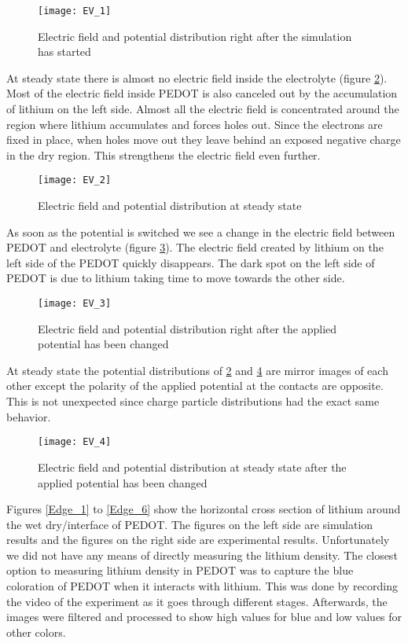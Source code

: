 \begin{figure}[!htp]
\centering
\texttt{[image: EV\_1]}
\caption{Electric field and potential distribution right after the simulation has started} 
\label{EV_1}
\end{figure}

At steady state there is almost no electric field inside the electrolyte (figure \ref{EV_2}). Most of the electric field inside PEDOT is also canceled out by the accumulation of lithium on the left side. Almost all the electric field is concentrated around the region where lithium accumulates and forces holes out. Since the electrons are fixed in place, when holes move out they leave behind an exposed negative charge in the dry region. This strengthens the electric field even further.

\begin{figure}[!htp]
\centering
\texttt{[image: EV\_2]}
\caption{Electric field and potential distribution at steady state} 
\label{EV_2}
\end{figure}

As soon as the potential is switched we see a change in the electric field between PEDOT and electrolyte (figure \ref{EV_3}). The electric field created by lithium on the left side of the PEDOT quickly disappears. The dark spot on the left side of PEDOT is due to lithium taking time to move towards the other side.

\begin{figure}[!htp]
\centering
\texttt{[image: EV\_3]}
\caption{Electric field and potential distribution right after the applied potential has been changed} 
\label{EV_3}
\end{figure}

At steady state the potential distributions of \ref{EV_2} and \ref{EV_4} are mirror images of each other except the polarity of the applied potential at the contacts are opposite. This is not unexpected since charge particle distributions had the exact same behavior. 

\begin{figure}[!htp]
\centering
\texttt{[image: EV\_4]}
\caption{Electric field and potential distribution at steady state after the applied potential has been changed} 
\label{EV_4}
\end{figure}

Figures \ref{Edge_1} to \ref{Edge_6} show the horizontal cross section of lithium around the wet dry/interface of PEDOT. The figures on the left side are simulation results and the figures on the right side are experimental results. Unfortunately we did not have any means of directly measuring the lithium density. The closest option to measuring lithium density in PEDOT was to capture the blue coloration of PEDOT when it interacts with lithium. This was done by recording the video of the experiment as it goes through different stages. Afterwards, the images were filtered and processed to show high values for blue and low values for other colors. 

